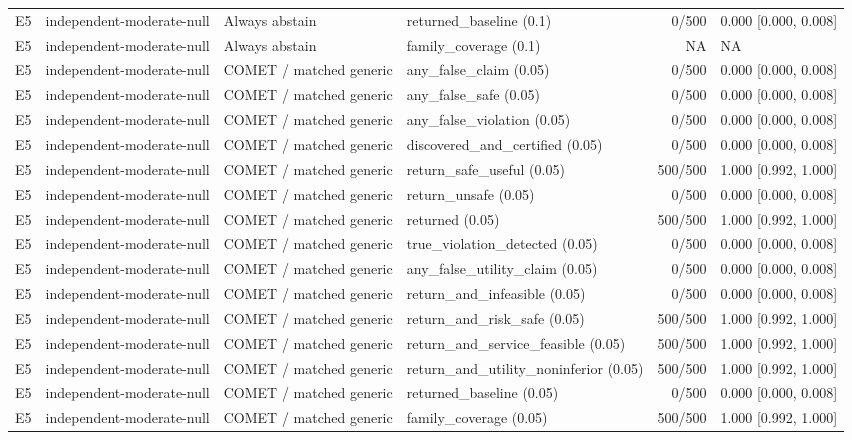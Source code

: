 \begin{longtable}{p{.04\linewidth}p{.18\linewidth}p{.19\linewidth}p{.16\linewidth}r p{.21\linewidth}}
E5 & independent-moderate-null & Always abstain & returned\_baseline (0.1) & 0/500 & 0.000 [0.000, 0.008]\\
E5 & independent-moderate-null & Always abstain & family\_coverage (0.1) & NA & NA\\
E5 & independent-moderate-null & COMET / matched generic & any\_false\_claim (0.05) & 0/500 & 0.000 [0.000, 0.008]\\
E5 & independent-moderate-null & COMET / matched generic & any\_false\_safe (0.05) & 0/500 & 0.000 [0.000, 0.008]\\
E5 & independent-moderate-null & COMET / matched generic & any\_false\_violation (0.05) & 0/500 & 0.000 [0.000, 0.008]\\
E5 & independent-moderate-null & COMET / matched generic & discovered\_and\_certified (0.05) & 0/500 & 0.000 [0.000, 0.008]\\
E5 & independent-moderate-null & COMET / matched generic & return\_safe\_useful (0.05) & 500/500 & 1.000 [0.992, 1.000]\\
E5 & independent-moderate-null & COMET / matched generic & return\_unsafe (0.05) & 0/500 & 0.000 [0.000, 0.008]\\
E5 & independent-moderate-null & COMET / matched generic & returned (0.05) & 500/500 & 1.000 [0.992, 1.000]\\
E5 & independent-moderate-null & COMET / matched generic & true\_violation\_detected (0.05) & 0/500 & 0.000 [0.000, 0.008]\\
E5 & independent-moderate-null & COMET / matched generic & any\_false\_utility\_claim (0.05) & 0/500 & 0.000 [0.000, 0.008]\\
E5 & independent-moderate-null & COMET / matched generic & return\_and\_infeasible (0.05) & 0/500 & 0.000 [0.000, 0.008]\\
E5 & independent-moderate-null & COMET / matched generic & return\_and\_risk\_safe (0.05) & 500/500 & 1.000 [0.992, 1.000]\\
E5 & independent-moderate-null & COMET / matched generic & return\_and\_service\_feasible (0.05) & 500/500 & 1.000 [0.992, 1.000]\\
E5 & independent-moderate-null & COMET / matched generic & return\_and\_utility\_noninferior (0.05) & 500/500 & 1.000 [0.992, 1.000]\\
E5 & independent-moderate-null & COMET / matched generic & returned\_baseline (0.05) & 0/500 & 0.000 [0.000, 0.008]\\
E5 & independent-moderate-null & COMET / matched generic & family\_coverage (0.05) & 500/500 & 1.000 [0.992, 1.000]\\

\end{longtable}
